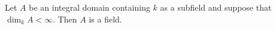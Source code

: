 Let $A$ be an integral domain containing $k$ as a subfield and suppose that $\dim_k A < \infty$. Then $A$ is a field.
